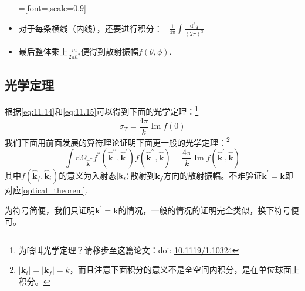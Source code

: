 \documentclass[a4paper,zihao=-4,linespread=1]{ctexrep}
\newcommand{\DOI}[1]{doi: \href{https://doi.org/#1}{#1}} %
\begin{document}
\begin{itemize}
		\begin{center}
			=[font=\large,scale=0.9]
		\end{center}
	
		\item 对于每条横线（内线），还要进行积分：$-\frac{1}{4\pi}\int\frac{\mathrm{d}^3q}{(2\pi)^3}$
		\item 最后整体乘上$\frac{m}{2\pi\hbar^2}$便得到散射振幅$f(\theta,\phi)$.
	\end{itemize}
	\subsection{光学定理}
	根据\ref{eq:11.14}和\ref{eq:11.15}可以得到下面的光学定理：\footnote{为啥叫光学定理？请移步至这篇论文：\DOI{10.1119/1.10324}}
	\begin{equation}
		\label{optical_theorem}
		\boxed{
		\sigma_T=\frac{4\pi}{k}\operatorname{Im}f(0)
	}
	\end{equation}
	我们下面用前面发展的算符理论证明下面更一般的光学定理：\footnote{$|\mathbf{k}_i|=|\mathbf{k}_f|=k$，而且注意下面积分的意义不是全空间内积分，是在单位球面上积分。}
	\begin{equation}
		\boxed{
		\int \mathrm{d}\Omega_{\hat{\mathbf {k}}^{\prime\prime}}f^*(\hat{\mathbf{k}}^{\prime\prime},\hat{\mathbf{k}}^\prime)f(\hat{\mathbf{k}}^{\prime\prime},\hat{\mathbf{k}})=\frac{4\pi}{k}\operatorname{Im}f(\hat{\mathbf{k}}^\prime,\hat{\mathbf{k}})}
	\end{equation}
	其中$f(\hat{\mathbf{k}}_f,\hat{\mathbf{k}}_i)$的意义为入射态$\ket{\mathbf{k}_i}$散射到$\mathbf{k}_f$方向的散射振幅。不难验证$\mathbf{k}^\prime=\mathbf{k}$即对应\ref{optical_theorem}.
	
	为符号简便，我们只证明$\mathbf{k}^\prime=\mathbf{k}$的情况，一般的情况的证明完全类似，换下符号便可。
	
\end{document}
